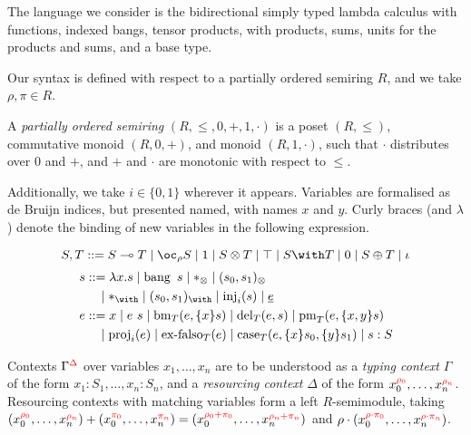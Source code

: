 The language we consider is the bidirectional\cite{DBLP:journals/toplas/PierceT00} simply typed lambda
calculus\cite{Barendregt92lambdacalculi} with functions, indexed bangs, tensor products, with products,
sums, units for the products and sums, and a base type.

Our syntax is defined with respect to a partially ordered semiring $R$, and we take $\rho,\pi \in R$.

\begin{definition}
  A \emph{partially ordered semiring} $(R, \leq, 0, +, 1 , \cdot)$ is a poset $(R, \leq)$, commutative monoid $(R, 0, +)$, and monoid $(R, 1, \cdot)$, such that $\cdot$ distributes over $0$ and $+$, and $+$ and $\cdot$ are monotonic with respect to $\leq$.
\end{definition}

Additionally, we take $i \in \{0,1\}$ wherever it appears.
Variables are formalised as de Bruijn indices\cite{deBruijn:dummies}, but
presented named, with names $x$ and $y$.
Curly braces (and $\lambda$) denote the binding of new variables in the following expression.

\begin{displaymath}
  S,T ::= \fun{S}{T} \mid \excl{\rho}{S} \mid \tensorOne \mid \tensor{S}{T} \mid
  \withTOne \mid \withT{S}{T} \mid \sumTZero \mid \sumT{S}{T} \mid \iota
\end{displaymath}
\begin{displaymath}
  \begin{aligned}
    s &  ::= \lam{x}{s} \mid \bang{s} \mid \unit \mid \ten{s_0}{s_1} \\
      & \quad \mid \eat \mid \wth{s_0}{s_1} \mid \inj{i}{s} \mid \emb{e} \\
    e &  ::= x \mid \app{e}{s} \mid \bm{T}{e}{\bind{x}{s}} \mid \del{T}{e}{s} \mid \prm{T}{e}{\bind{x,y}{s}} \\
      & \quad \mid \proj{i}{e} \mid \exf{T}{e} \mid
             \cse{T}{e}{\bind{x}{s_0}}{\bind{y}{s_1}} \mid \ann{s}{S}
  \end{aligned}
\end{displaymath}

Contexts $\Gamma^{\color{red}\Delta}$ over variables $x_1, \ldots, x_n$ are to be understood as a \emph{typing context} $\Gamma$ of the form $x_1 : S_1, \ldots, x_n : S_n$, and a \emph{resourcing context} $\Delta$ of the form $x_0^{{\color{red}\rho_0}}, \ldots, x_n^{{\color{red}\rho_n}}$.
Resourcing contexts with matching variables form a left $R$-semimodule, taking $(x_0^{{\color{red}\rho_0}}, \ldots, x_n^{{\color{red}\rho_n}}) + (x_0^{{\color{red}\pi_0}}, \ldots, x_n^{{\color{red}\pi_n}}) = (x_0^{{\color{red}\rho_0 + \pi_0}}, \ldots, x_n^{{\color{red}\rho_n + \pi_n}})$ and $\rho \cdot (x_0^{{\color{red}\rho \cdot \pi_0}}, \ldots, x_n^{{\color{red}\rho \cdot \pi_n}})$.

